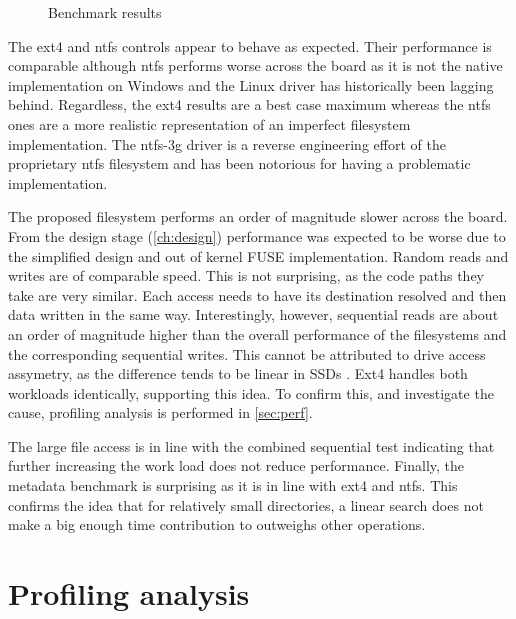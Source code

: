         \begin{figure}[h]
            
            \vspace{-20pt}
            \caption{Benchmark results}
            \label{fig:benchmark}
        \end{figure}

        The ext4 and ntfs controls appear to behave as expected. Their
        performance is comparable although ntfs performs worse across the board
        as it is not the native implementation on Windows and the Linux driver has
        historically been lagging behind. Regardless, the ext4 results are a
        best case maximum whereas the ntfs ones are a more realistic
        representation of an imperfect filesystem implementation. The ntfs-3g
        driver is a reverse engineering effort of the proprietary ntfs
        filesystem and has been notorious for having a problematic
        implementation.

        The proposed filesystem performs an order of magnitude slower across
        the board. From the design stage (\autoref{ch:design}) performance was
        expected to be worse due to the simplified design and out of kernel
        FUSE implementation. Random reads and writes are of comparable speed.
        This is not surprising, as the code paths they take are very similar. Each
        access needs to have its destination resolved and then data written in
        the same way. Interestingly, however, sequential reads are about an
        order of magnitude higher than the overall performance of the
        filesystems and the corresponding sequential writes. This cannot be
        attributed to drive access assymetry, as the difference tends to be
        linear in SSDs \cite{servethehome_review}. Ext4 handles both workloads
        identically, supporting this idea. To confirm this, and investigate the
        cause, profiling analysis is performed in \autoref{sec:perf}.

        The large file access is in line with the combined sequential test
        indicating that further increasing the work load does not reduce
        performance. Finally, the metadata benchmark is surprising as it is in
        line with ext4 and ntfs. This confirms the idea that for relatively
        small directories, a linear search does not make a big enough time
        contribution to outweighs other operations.

    \section{Profiling analysis}
        \label{sec:perf}

